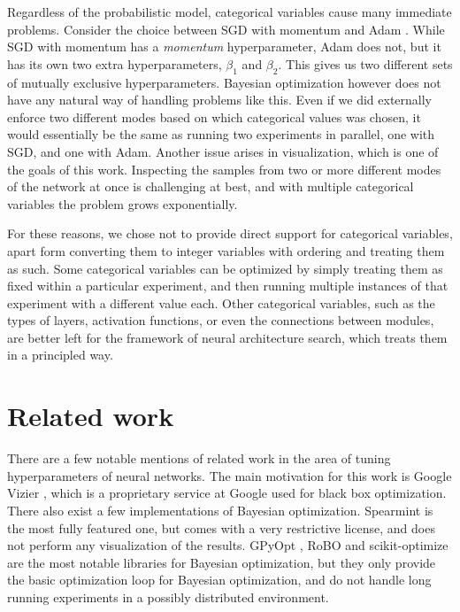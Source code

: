 Regardless of the probabilistic model, categorical variables cause many
immediate problems.  Consider the choice between SGD with momentum
\citep{overview-of-sgd} and Adam \citep{kingma2014adam}.  While SGD with
momentum has a \emph{momentum} hyperparameter, Adam does not, but it has its
own two extra hyperparameters, $\beta_1$ and $\beta_2$. This gives us two
different sets of mutually exclusive hyperparameters. Bayesian optimization
however does not have any natural way of handling problems like this. Even if
we did externally enforce two different modes based on which categorical values
was chosen, it would essentially be the same as running two experiments in
parallel, one with SGD, and one with Adam. Another issue arises in
visualization, which is one of the goals of this work. Inspecting the samples
from two or more different modes of the network at once is challenging at best,
and with multiple categorical variables the problem grows exponentially.

For these reasons, we chose not to provide direct support for categorical
variables, apart form converting them to integer variables with ordering and
treating them as such. Some categorical variables can be optimized by simply
treating them as fixed within a particular experiment, and then running
multiple instances of that experiment with a different value each. Other
categorical variables, such as the types of layers, activation functions, or
even the connections between modules, are better left for the framework of
neural architecture search, which treats them in a principled way.


\section{Related work}

There are a few notable mentions of related work in the area of tuning
hyperparameters of neural networks. The main motivation for this work is Google
Vizier \citep{google-vizier}, which is a proprietary service at Google used for
black box optimization. There also exist a few implementations of Bayesian
optimization. Spearmint \citep{spearmint} is the most fully featured one, but
comes with a very restrictive license, and does not perform any visualization
of the results. GPyOpt \citep{gpyopt2016}, RoBO \citep{robo} and
scikit-optimize \citep{scikit-optimize} are the most notable libraries for
Bayesian optimization, but they only provide the basic optimization loop for
Bayesian optimization, and do not handle long running experiments in a possibly
distributed environment.

